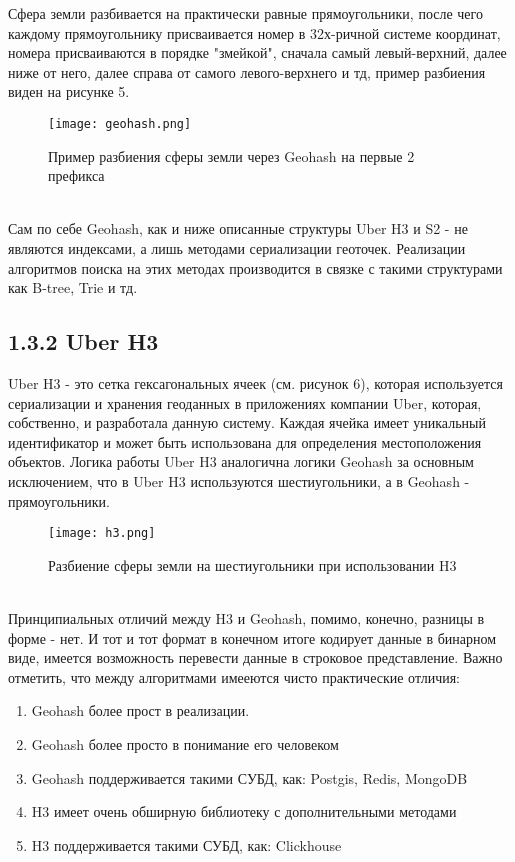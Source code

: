 Сфера земли разбивается на практически равные прямоугольники, после чего каждому прямоугольнику присваивается номер в 32х-ричной системе координат, номера присваиваются в порядке "змейкой", сначала самый левый-верхний, далее ниже от него, далее справа от самого левого-верхнего и тд, пример разбиения виден на рисунке 5.
  \\
\begin{figure}[h]
    \centering
    \texttt{[image: geohash.png]}
    \caption{Пример разбиения сферы земли через Geohash на первые 2 префикса}
\end{figure}
  \\
Сам по себе Geohash, как и ниже описанные структуры Uber H3 и S2 - не являются индексами, а лишь методами сериализации геоточек. Реализации алгоритмов поиска на этих методах производится в связке с такими структурами как B-tree, Trie и тд. 

\subsection{1.3.2 Uber H3}
Uber H3 - это сетка гексагональных ячеек (см. рисунок 6), которая используется сериализации и хранения геоданных в приложениях компании Uber, которая, собственно, и разработала данную систему. Каждая ячейка имеет уникальный идентификатор и может быть использована для определения местоположения объектов. Логика работы Uber H3 аналогична логики Geohash за основным исключением, что в Uber H3 используются шестиугольники, а в Geohash - прямоугольники. 
  \\
\begin{figure}[h]
    \centering
    \texttt{[image: h3.png]}
    \caption{Разбиение сферы земли на шестиугольники при использовании H3}
\end{figure}
  \\
Принципиальных отличий между H3 и Geohash, помимо, конечно, разницы в форме - нет. И тот и тот формат в конечном итоге кодирует данные в бинарном виде, имеется возможность перевести данные в строковое представление.  
Важно отметить, что между алгоритмами имееются чисто практические отличия:
\begin{enumerate}
    \item Geohash более прост в реализации. 
    \item Geohash более просто в понимание его человеком
    \item Geohash поддерживается такими СУБД, как: Postgis, Redis, MongoDB
    \item H3 имеет очень обширную библиотеку с дополнительными методами
    \item H3 поддерживается такими СУБД, как: Clickhouse
\end{enumerate}

